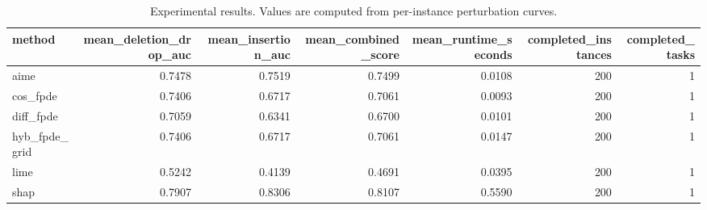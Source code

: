 \begin{table}[t]
\caption{Experimental results. Values are computed from per-instance perturbation curves.}
\label{tab:main_results_computed}
\centering
\begin{tabular}{lrrrrrr}
\toprule
method & mean\_deletion\_drop\_auc & mean\_insertion\_auc & mean\_combined\_score & mean\_runtime\_seconds & completed\_instances & completed\_tasks \\
\midrule
aime & 0.7478 & 0.7519 & 0.7499 & 0.0108 & 200 & 1 \\
cos\_fpde & 0.7406 & 0.6717 & 0.7061 & 0.0093 & 200 & 1 \\
diff\_fpde & 0.7059 & 0.6341 & 0.6700 & 0.0101 & 200 & 1 \\
hyb\_fpde\_grid & 0.7406 & 0.6717 & 0.7061 & 0.0147 & 200 & 1 \\
lime & 0.5242 & 0.4139 & 0.4691 & 0.0395 & 200 & 1 \\
shap & 0.7907 & 0.8306 & 0.8107 & 0.5590 & 200 & 1 \\
\bottomrule
\end{tabular}

\end{table}
